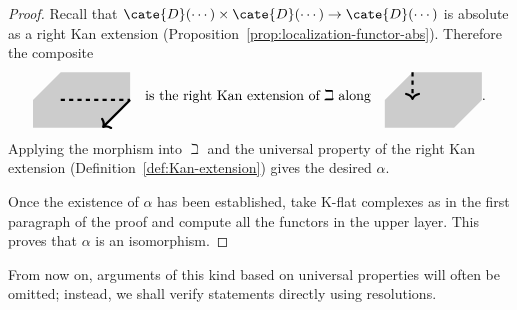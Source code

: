 \begin{proof}
	Recall that
	$\cate{D}(\cdots)\times\cate{D}(\cdots)\to\cate{D}(\cdots)$ is absolute
	as a right Kan extension
	(Proposition~\ref{prop:localization-functor-abs}). Therefore the composite
	\begin{equation*}\begin{gathered}
		\begin{tikzpicture}[baseline=(O), scale=0.7]
			\fill[gray!40] (-1, 1) -- (1.5, 1) -- (1.5, 0) -- (0.5, -1) -- (-2, -1) -- (-2, 0) --cycle;
			\draw[ultra thick, dashed] (-1,0) -- (1.5, 0);
			\draw[ultra thick, ->] (1.5, 0)  -- (0.5, -1);
			\coordinate (O) at (0, 0);
		\end{tikzpicture}
		\quad \text{is the right Kan extension of $\beth$ along} \quad
		\begin{tikzpicture}[baseline=(O), scale=0.7]
			\fill[gray!40] (-1, 1) -- (1.5, 1) -- (1.5, 0) -- (0.5, -1) -- (-2, -1) -- (-2, 0) --cycle;
			\draw[ultra thick, dashed, ->] (-1, 1) -- (-1, 0);
			\coordinate (O) at (0, 0);
		\end{tikzpicture}.
	\end{gathered}\end{equation*}
	Applying the morphism into $\beth$ and the universal property of the right
	Kan extension (Definition~\ref{def:Kan-extension}) gives the desired
	$\alpha$.

	Once the existence of $\alpha$ has been established, take K-flat complexes
	as in the first paragraph of the proof and compute all the functors in the
	upper layer. This proves that $\alpha$ is an isomorphism.
\end{proof}

From now on, arguments of this kind based on universal properties will often
be omitted; instead, we shall verify statements directly using resolutions.
